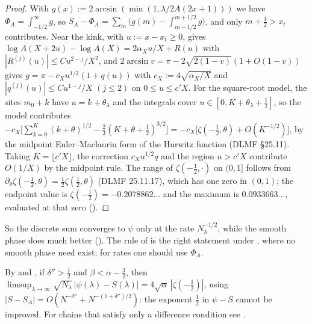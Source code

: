 \begin{proof}
With $g(x):=2\arcsin(\min(1,\lambda/2A(2x+1)))$ we have $\Phi_A=\int_{-1/2}^\infty g$, so
$S_A-\Phi_A=\sum_m\bigl(g(m)-\int_{m-1/2}^{m+1/2}g\bigr)$, and only $m+\frac12>x_t$
contributes. Near the kink, with $u:=x-x_t\ge0$,  gives
$\log A(X+2u)-\log A(X)=2\alpha_Xu/X+R(u)$ with $|R^{(j)}(u)|\le Cu^{2-j}/X^2$, and
$2\arcsin v=\pi-2\sqrt{2(1-v)}(1+O(1-v))$ gives $g=\pi-c_Xu^{1/2}(1+q(u))$ with
$c_X:=4\sqrt{\alpha_X/X}$ and $|q^{(j)}(u)|\le Cu^{1-j}/X$ $(j\le2)$ on $0\le u\le c'X$. For the
square-root model, the sites $m_0+k$ have $u=k+\theta_\lambda$ and the integrals cover
$u\in[0,K+\theta_\lambda+\frac12]$, so the model contributes
$-c_X\bigl[\sum_{k=0}^K(k+\theta)^{1/2}-\frac23(K+\theta+\frac12)^{3/2}\bigr]=-c_X\bigl[\zeta(-\frac12,\theta)+O(K^{-1/2})\bigr]$,
by the midpoint Euler--Maclaurin form of the Hurwitz function (DLMF \S25.11). Taking
$K=\lfloor c'X\rfloor$, the correction $c_Xu^{1/2}q$ and the region $u>c'X$ contribute
$O(1/X)$ by the midpoint rule. The range of $\zeta(-\frac12,\cdot)$ on $(0,1]$ follows from
$\partial_\theta\zeta(-\frac12,\theta)=\frac12\zeta(\frac12,\theta)$ (DLMF 25.11.17), which has one zero in $(0,1)$; the
endpoint value is $\zeta(-\frac12)=-0.2078862\ldots$ and the maximum is $0.0933663\ldots$, evaluated at
that zero ().
\end{proof}

So the discrete sum converges to $\psi$ only at the rate $N_\lambda^{-1/2}$, while the smooth
phase does much better (). The rule of  is the right
statement under , where no smooth phase need exist; for rates one should
use $\Phi_A$.

\begin{remark}\label{rem:blocksum}
By  and , if $\delta''>\frac12$ and $\beta<\alpha-\frac32$, then
$\limsup_{\lambda\to\infty}\sqrt{N_\lambda}\,|\psi(\lambda)-S(\lambda)|=4\sqrt\alpha\,|\zeta(-\frac12)|$, using
$|S-S_A|=O(N^{-\delta''}+N^{-(1+\delta'')/2})$: the exponent $\frac12$ in $\psi-S$ cannot be improved. For
chains that satisfy only a difference condition see .
\end{remark}
